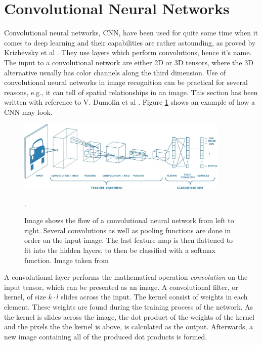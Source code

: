  \section{Convolutional Neural Networks}
 \label{sec:CNN}
Convolutional neural networks, CNN, have been used for quite some time when it comes to deep learning and their capabilities are rather astounding, as proved by Krizhevsky et al \cite{NIPS2012_4824}.  They use layers which perform convolutions, hence it's name.  The input to a convolutional network are either 2D or 3D tensors, where the 3D alternative usually has color channels along the third dimension. Use of convolutional neural networks in image recognition  can be practical for several reasons, e.g., it can tell of spatial relationships in an image. This section has been written with reference to V. Dumolin et al \cite{convArit}. Figure \ref{fig:cnn} shows an example of how a CNN may look.
 
 \begin{figure}[hbtp]
\begin{center}
\includegraphics[width = 0.9\textwidth]{./Images/convNetwork.jpg}
\caption{Image shows the flow of a convolutional neural network from left to right. Several convolutions as well as pooling functions are done in order on the input image. The last feature map is then flattened to fit into the hidden layers, to then be classified with a softmax function. Image taken from \cite{cnnImage}}.
\label{fig:cnn}
\end{center}
\end{figure}
 
A convolutional layer performs the mathematical operation \textit{convolution} on the input tensor, which can be presented as an image. A convolutional filter, or kernel, of size $k \cdot l$ slides across the input. The kernel consist of weights in each element. These weights are found during the training process of the network. As the kernel is slides across the image, the dot product of the weights of the kernel and the pixels the the kernel is above, is calculated as the output. Afterwards, a new image containing all of the produced dot products is formed.

